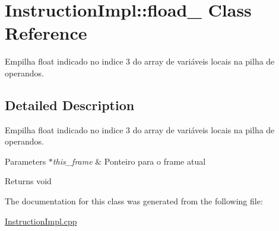 \hypertarget{class_instruction_impl_1_1fload__3}{}\section{Instruction\+Impl\+:\+:fload\+\_ Class Reference}
\label{class_instruction_impl_1_1fload__3}


Empilha float indicado no indice 3 do array de variáveis locais na pilha de operandos.  




\subsection{Detailed Description}
Empilha float indicado no indice 3 do array de variáveis locais na pilha de operandos. 


\begin{DoxyParams}{Parameters}
{\em $\ast$this\+\_\+frame} & Ponteiro para o frame atual \\
\hline
\end{DoxyParams}
\begin{DoxyReturn}{Returns}
void 
\end{DoxyReturn}


The documentation for this class was generated from the following file\+:\begin{DoxyCompactItemize}
\item 
\hyperlink{_instruction_impl_8cpp}{Instruction\+Impl.\+cpp}\end{DoxyCompactItemize}
